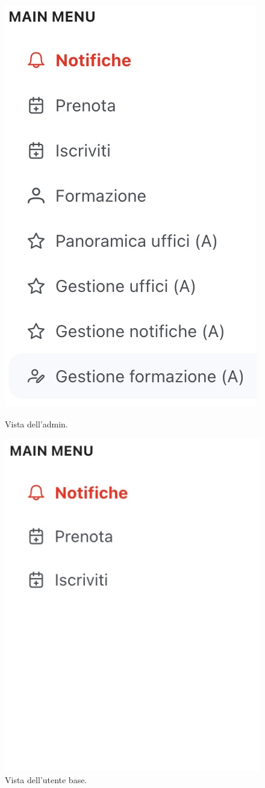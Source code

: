 \begin{figure}[!htb]
    \centering
    \begin{minipage}{.5\textwidth}
        \centering
        \includegraphics[width=.6\textwidth]{Images/admin.jpg}
        \centering
        \caption{\label{fig:admin}Vista dell'admin.}
    \end{minipage}%
    \begin{minipage}{0.5\textwidth}
        \centering
        \includegraphics[width=.5\textwidth]{Images/base.jpg}
        \caption{\label{fig:base}Vista dell'utente base.}
    \end{minipage}
\end{figure}

